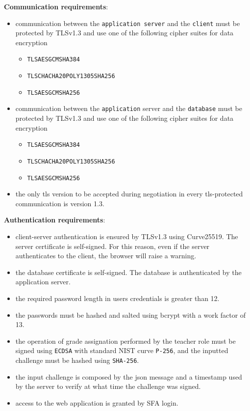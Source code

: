 \noindent\textbf{Communication requirements}:
\begin{itemize}
    \item communication between the \texttt{application server} and the \texttt{client} must be protected by TLSv1.3 and use one of the following cipher suites for data encryption
    \begin{itemize}
        \item \texttt{TLS\textunderscore AES\textunderscore GCM\textunderscore SHA384}
        \item \texttt{TLS\textunderscore CHACHA20\textunderscore POLY1305\textunderscore SHA256}
        \item \texttt{TLS\textunderscore AES\textunderscore GCM\textunderscore SHA256}
    \end{itemize} 
    \item communication between the \texttt{application} server and the \texttt{database} must be protected by TLSv1.3 and use one of the following cipher suites for data encryption
    \begin{itemize}
        \item \texttt{TLS\textunderscore AES\textunderscore GCM\textunderscore SHA384}
        \item \texttt{TLS\textunderscore CHACHA20\textunderscore POLY1305\textunderscore SHA256}
        \item \texttt{TLS\textunderscore AES\textunderscore GCM\textunderscore SHA256}
    \end{itemize}
    \item the only tls version to be accepted during negotiation in every tls-protected communication is version 1.3. 
\end{itemize}

\noindent\textbf{Authentication requirements}:
\begin{itemize}
    \item client-server authentication is ensured by TLSv1.3 using Curve25519. The server certificate is self-signed. For this reason, even if the server authenticates to the client, the browser will raise a warning.
    \item the database certificate is self-signed. The database is authenticated by the application server.
    \item the required password length in users credentials is greater than 12.
    \item the passwords must be hashed and salted using bcrypt with a work factor of 13.
    \item the operation of grade assignation performed by the teacher role must be signed using \texttt{ECDSA} with standard NIST curve \texttt{P-256}, and the inputted challenge must be hashed using \texttt{SHA-256}.
    \item the input challenge is composed by the json message and a timestamp used by the server to verify at what time the challenge was signed.
    \item access to the web application is granted by SFA login.
\end{itemize}

